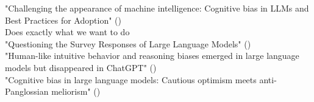 "Challenging the appearance of machine intelligence: Cognitive bias in LLMs and Best Practices for Adoption" (\cite{talboy2023challenging}) \\
Does exactly what we want to do \\
"Questioning the Survey Responses of Large Language Models" (\cite{dominguez2023questioning}) \\
"Human-like intuitive behavior and reasoning biases emerged in large language models but disappeared in ChatGPT" (\cite{hagendorff2023human}) \\
"Cognitive bias in large language models: Cautious optimism meets anti-Panglossian meliorism" (\cite{thorstad2023cognitive}) \\